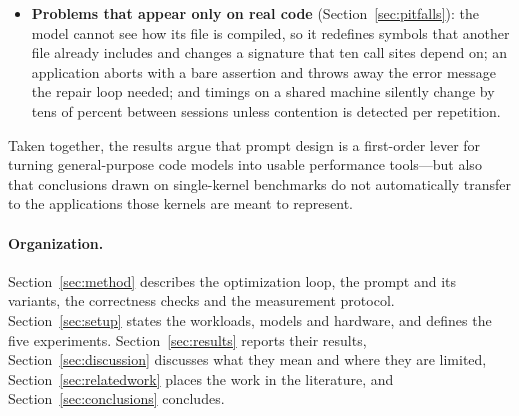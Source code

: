 \begin{itemize}
  at repetition spreads below $5\%$. Interpretation widens the spread of outcomes rather than shifting
  its centre, which a mean speedup hides.
\item \textbf{Problems that appear only on real code} (Section~\ref{sec:pitfalls}): the model cannot see
  how its file is compiled, so it redefines symbols that another file already includes and changes a
  signature that ten call sites depend on; an application aborts with a bare assertion and throws away
  the error message the repair loop needed; and timings on a shared machine silently change by tens of
  percent between sessions unless contention is detected per repetition.
\end{itemize}

Taken together, the results argue that prompt design is a first-order lever for turning general-purpose
code models into usable performance tools---but also that conclusions drawn on single-kernel benchmarks
do not automatically transfer to the applications those kernels are meant to represent.

\paragraph{Organization.}
Section~\ref{sec:method} describes the optimization loop, the prompt and its variants, the
correctness checks and the measurement protocol. Section~\ref{sec:setup} states the workloads, models
and hardware, and defines the five experiments. Section~\ref{sec:results} reports their results,
Section~\ref{sec:discussion} discusses what they mean and where they are limited,
Section~\ref{sec:relatedwork} places the work in the literature, and Section~\ref{sec:conclusions}
concludes.
